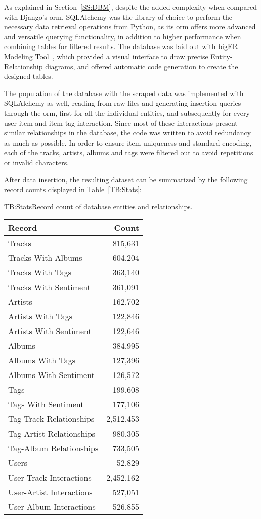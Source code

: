 As explained in Section~\ref{SS:DBM}, despite the added complexity when compared with Django's \acs{orm}, SQLAlchemy was the library of choice to perform the necessary data retrieval operations from Python, as its \acs{orm} offers more advanced and versatile querying functionality, in addition to higher performance when combining tables for filtered results. The database was laid out with bigER Modeling Tool~\cite{BIGER}, which provided a visual interface to draw precise Entity-Relationship diagrams, and offered automatic code generation to create the designed tables.

The population of the database with the scraped data was implemented with SQLAlchemy as well, reading from raw files and generating insertion queries through the \acs{orm}, first for all the individual entities, and subsequently for every user-item and item-tag interaction. Since most of these interactions present similar relationships in the database, the code was written to avoid redundancy as much as possible. In order to ensure item uniqueness and standard encoding, each of the tracks, artists, albums and tags were filtered out to avoid repetitions or invalid characters.

After data insertion, the resulting dataset can be summarized by the following record counts displayed in Table~\ref{TB:Stats}:

\begin{table}[Database statistics]{TB:Stats}{Record count of database entities and relationships.}
  \small
    \begin{tabular}{l r}
      \hline
      \textbf{Record} & \textbf{Count} \\
      \hline
      \hline
      Tracks & 815,631 \\
      Tracks With Albums & 604,204 \\
      Tracks With Tags & 363,140 \\
      Tracks With Sentiment & 361,091 \\
      \hline
      Artists & 162,702 \\
      Artists With Tags & 122,846 \\
      Artists With Sentiment & 122,646 \\
      \hline
      Albums & 384,995 \\
      Albums With Tags & 127,396 \\
      Albums With Sentiment & 126,572 \\
      \hline
      Tags & 199,608 \\
      Tags With Sentiment & 177,106 \\
      Tag-Track Relationships & 2,512,453 \\
      Tag-Artist Relationships & 980,305 \\
      Tag-Album Relationships & 733,505 \\
      \hline
      Users & 52,829 \\
      User-Track Interactions & 2,452,162 \\
      User-Artist Interactions & 527,051 \\
      User-Album Interactions & 526,855 \\
      \hline
    \end{tabular}
\end{table}